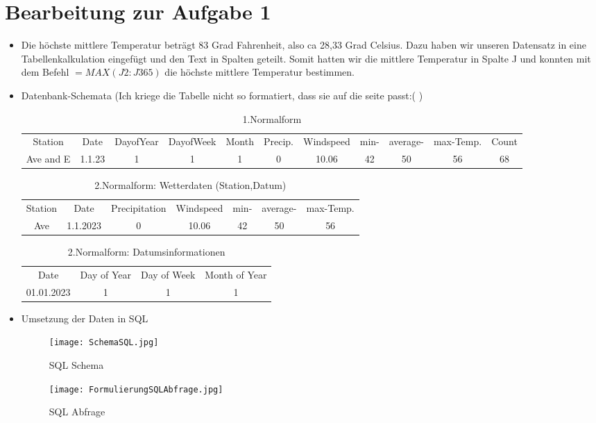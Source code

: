 \documentclass{article}
\begin{document}
\section{Bearbeitung zur Aufgabe 1}
\begin{itemize}
    \item Die höchste mittlere Temperatur beträgt 83 Grad Fahrenheit, also ca 28,33 Grad Celsius. Dazu haben wir unseren Datensatz in eine Tabellenkalkulation eingefügt und den Text in Spalten geteilt. Somit hatten wir die mittlere Temperatur in Spalte J und konnten mit dem Befehl $=MAX(J2:J365)$ die höchste mittlere Temperatur bestimmen.
    \item Datenbank-Schemata (Ich kriege die Tabelle nicht so formatiert, dass sie auf die seite passt:( )

 \begin{table}[h]
        \centering
        \begin{tabular}{|c|c|c|c|c|c|c|c|c|c|c|}
        \hline 
            Station&Date&DayofYear&DayofWeek&Month&Precip.&Windspeed&min-&average-&max-Temp.&Count\\
            Ave and E &1.1.23&1&1&1&0&10.06&42&50&56&68\\
        \end{tabular}
        \caption{1.Normalform}
        \label{1. Normalform}
    \end{table}
\begin{table}[h]
    \centering
    \begin{tabular}{|c|c|c|c|c|c|c|}
    \hline
        Station&Date&Precipitation&Windspeed&min-&average-&max-Temp.\\
         Ave&1.1.2023&0&10.06&42&50&56
    \end{tabular}
    \caption{2.Normalform: Wetterdaten (Station,Datum) }
    \label{tab:my_label}
\end{table}
\begin{table}[ht]
    \centering
    \begin{tabular}{|c|c|c|c|}
    \hline
         Date&Day of Year&Day of Week&Month of Year  \\
         01.01.2023&1&1&1 
    \end{tabular}
    \caption{2.Normalform: Datumsinformationen}
    \label{tab:my_label}
\end{table}
\newpage
\item Umsetzung der Daten in SQL

\begin{figure}
    \centering
    \texttt{[image: SchemaSQL.jpg]}
    \caption{SQL Schema}
    \label{fig:enter-label}
\end{figure}
\begin{figure}
    \centering
    \texttt{[image: FormulierungSQLAbfrage.jpg]}
    \caption{SQL Abfrage}
    \label{fig:enter-label}
\end{figure}

\end{itemize}


\end{document}

